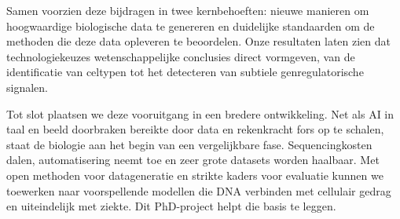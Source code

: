 Samen voorzien deze bijdragen in twee kernbehoeften: nieuwe manieren om hoogwaardige biologische data te genereren en duidelijke standaarden om de methoden die deze data opleveren te beoordelen. Onze resultaten laten zien dat technologiekeuzes wetenschappelijke conclusies direct vormgeven, van de identificatie van celtypen tot het detecteren van subtiele genregulatorische signalen.

Tot slot plaatsen we deze vooruitgang in een bredere ontwikkeling. Net als AI in taal en beeld doorbraken bereikte door data en rekenkracht fors op te schalen, staat de biologie aan het begin van een vergelijkbare fase. Sequencingkosten dalen, automatisering neemt toe en zeer grote datasets worden haalbaar. Met open methoden voor datageneratie en strikte kaders voor evaluatie kunnen we toewerken naar voorspellende modellen die DNA verbinden met cellulair gedrag en uiteindelijk met ziekte. Dit PhD-project helpt die basis te leggen.